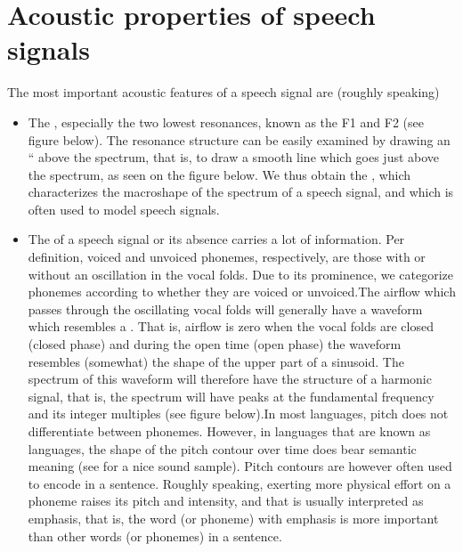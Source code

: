 \documentclass[letterpaper,10pt,english]{jupyterBook}
\begin{document}
\section{Acoustic properties of speech signals}
\label{\detokenize{Introduction/Speech_production_and_acoustic_properties:acoustic-properties-of-speech-signals}}
\sphinxAtStartPar
The most important acoustic features of a speech signal are (roughly
speaking)
\begin{itemize}
\item {} 
\sphinxAtStartPar
The , especially the two lowest
resonances, known as the  F1 and F2 (see figure below). The resonance structure can be easily examined by drawing an
“ above the spectrum, that is, to draw a smooth line
which goes just above the spectrum, as seen on the figure below. We thus obtain the , which characterizes
the macro\sphinxhyphen{}shape of the spectrum of a speech signal, and which is
often used to model speech signals.

\item {} 
\sphinxAtStartPar
The  of a speech signal or its absence
carries a lot of information. Per definition, voiced and unvoiced
phonemes, respectively, are those with or without an oscillation in
the vocal folds. Due to its prominence, we categorize phonemes
according to whether they are voiced or unvoiced.The airflow which passes through the oscillating vocal folds will
generally have a waveform which resembles a .
That is, airflow is zero when the vocal folds are closed (closed
phase) and during the open time (open phase) the waveform resembles
(somewhat) the shape of the upper part of a sinusoid. The spectrum
of this waveform will therefore have the structure of a harmonic
signal, that is, the spectrum will have peaks at the fundamental
frequency and its integer multiples (see figure below).In most languages, pitch does not differentiate between phonemes.
However, in languages that are known as  languages, the shape
of the pitch contour over time does bear semantic meaning (see
 for
a nice sound sample). Pitch contours are however often used to
encode  in a sentence. Roughly speaking, exerting more
physical effort on a phoneme raises its pitch and intensity, and
that is usually interpreted as emphasis, that is, the word (or
phoneme) with emphasis is more important than other words (or
phonemes) in a sentence.


\end{itemize}
\end{document}
